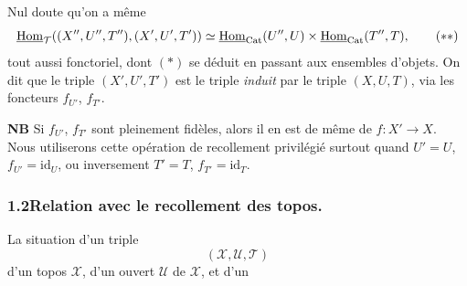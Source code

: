 Nul doute qu'on a même
\[
\uHom_{\mathcal{T}}((X'',U'',T''),(X',U',T')) \simeq \uHom_{\mathrm{Cat}}(U'',U) \times \uHom_{\mathrm{Cat}}(T'',T), \tag*{$(**)$}
\]
tout aussi fonctoriel, dont $(*)$ se déduit en passant aux ensembles d'objets. On dit que le triple $(X',U',T')$ est le triple \textit{induit} par le triple $(X,U,T)$, via les foncteurs $f_{U'}$, $f_{T'}$.

\textbf{NB} Si $f_{U'}$, $f_{T'}$ sont pleinement fidèles, alors il en est de même de $f : X' \longrightarrow X$. Nous utiliserons cette opération de recollement privilégié surtout quand $U' = U$, $f_{U'} = \mathrm{id}_U$, ou inversement $T' = T$, $f_{T'} = \mathrm{id}_T$.

\subsubsection*{1.2\quad Relation avec le recollement des topos.}

La situation d'un triple
\[
(\mathcal{X},\mathcal{U},\mathcal{T})
\]
d'un topos $\mathcal{X}$, d'un ouvert $\mathcal{U}$ de $\mathcal{X}$, et d'un


